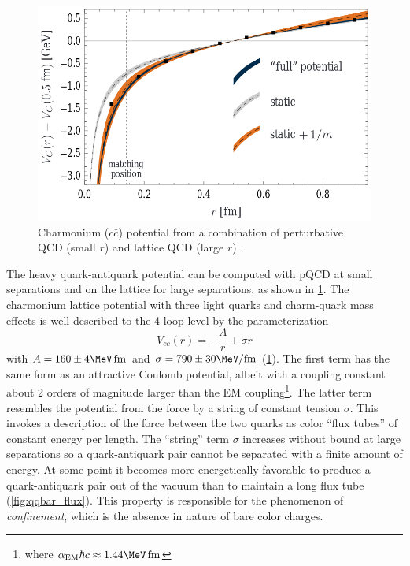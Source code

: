 \begin{figure}[t]
  \includegraphics{ccbar_potential.png}
  \caption{Charmonium ($c\bar{c}$) potential from a combination of perturbative QCD (small $r$) and lattice QCD (large $r$) \cite{Laschka:2011zr}.}
  \label{fig:charmonium_potential}
\end{figure}

The heavy quark-antiquark potential can be computed with \ac{pQCD} at small separations and on the lattice for large separations, as shown in \cref{fig:charmonium_potential}.
The charmonium lattice \qcd potential with three light quarks and charm-quark mass effects is well-described to the 4-loop level by the parameterization \cite{Laschka:2011zr}
\begin{equation}
V_{c\bar{c}}(r) = - \frac{A}{r} + \sigma r
\end{equation}
with $A = 160 \pm 4 \MeV\,\fm$ and $\sigma = 790 \pm 30 \MeV/\fm$ (\cref{fig:charmonium_potential}).
The first term has the same form as an attractive Coulomb potential, albeit with a coupling constant about 2 orders of magnitude larger than the \ac{EM} coupling\footnote{where $\alpha_\textrm{EM} \hbar c \approx 1.44 \MeV\,\fm$}.
The latter term resembles the potential from the force by a string of constant tension $\sigma$.
This invokes a description of the force between the two quarks as color ``flux tubes'' of constant energy per length.
The ``string'' term $\sigma$ increases without bound at large separations so a quark-antiquark pair cannot be separated with a finite amount of energy.
At some point it becomes more energetically favorable to produce a quark-antiquark pair out of the vacuum than to maintain a long flux tube (\cref{fig:qqbar_flux}).
This property is responsible for the phenomenon of \emph{confinement}, which is the absence in nature of bare color charges.

